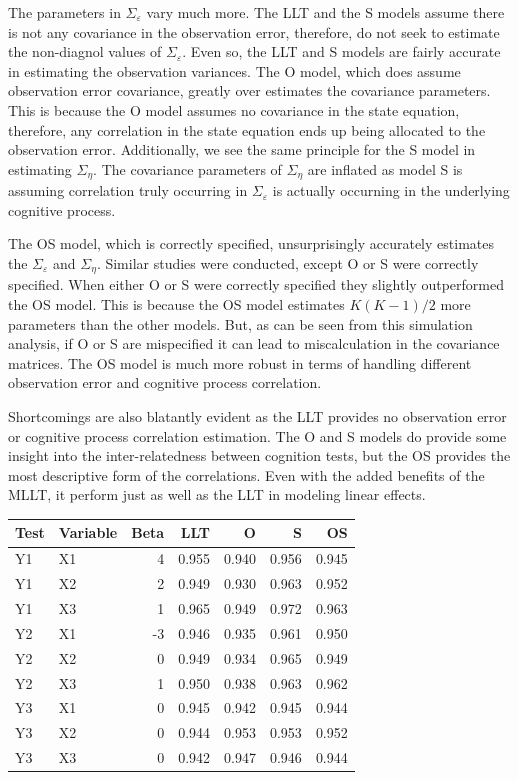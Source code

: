 \documentclass[
]{article}
\begin{document}
The parameters in \(\Sigma_\varepsilon\) vary much more. The LLT and the S models assume there is not any covariance in the observation error, therefore, do not seek to estimate the non-diagnol values of \(\Sigma_\varepsilon\). Even so, the LLT and S models are fairly accurate in estimating the observation variances. The O model, which does assume observation error covariance, greatly over estimates the covariance parameters. This is because the O model assumes no covariance in the state equation, therefore, any correlation in the state equation ends up being allocated to the observation error. Additionally, we see the same principle for the S model in estimating \(\Sigma_\eta\). The covariance parameters of \(\Sigma_\eta\) are inflated as model S is assuming correlation truly occurring in \(\Sigma_\varepsilon\) is actually occurning in the underlying cognitive process.

The OS model, which is correctly specified, unsurprisingly accurately estimates the \(\Sigma_\varepsilon\) and \(\Sigma_\eta\). Similar studies were conducted, except O or S were correctly specified. When either O or S were correctly specified they slightly outperformed the OS model. This is because the OS model estimates \(K(K-1)/2\) more parameters than the other models. But, as can be seen from this simulation analysis, if O or S are mispecified it can lead to miscalculation in the covariance matrices. The OS model is much more robust in terms of handling different observation error and cognitive process correlation.

Shortcomings are also blatantly evident as the LLT provides no observation error or cognitive process correlation estimation. The O and S models do provide some insight into the inter-relatedness between cognition tests, but the OS provides the most descriptive form of the correlations. Even with the added benefits of the MLLT, it perform just as well as the LLT in modeling linear effects.

\begin{longtable}[t]{l|l|r|r|r|r|r}
\hline
Test & Variable & Beta & LLT & O & S & OS\\
\hline
Y1 & X1 & 4 & 0.955 & 0.940 & 0.956 & 0.945\\
\hline
Y1 & X2 & 2 & 0.949 & 0.930 & 0.963 & 0.952\\
\hline
Y1 & X3 & 1 & 0.965 & 0.949 & 0.972 & 0.963\\
\hline
Y2 & X1 & -3 & 0.946 & 0.935 & 0.961 & 0.950\\
\hline
Y2 & X2 & 0 & 0.949 & 0.934 & 0.965 & 0.949\\
\hline
Y2 & X3 & 1 & 0.950 & 0.938 & 0.963 & 0.962\\
\hline
Y3 & X1 & 0 & 0.945 & 0.942 & 0.945 & 0.944\\
\hline
Y3 & X2 & 0 & 0.944 & 0.953 & 0.953 & 0.952\\
\hline
Y3 & X3 & 0 & 0.942 & 0.947 & 0.946 & 0.944\\
\hline
\end{longtable}
\end{document}
